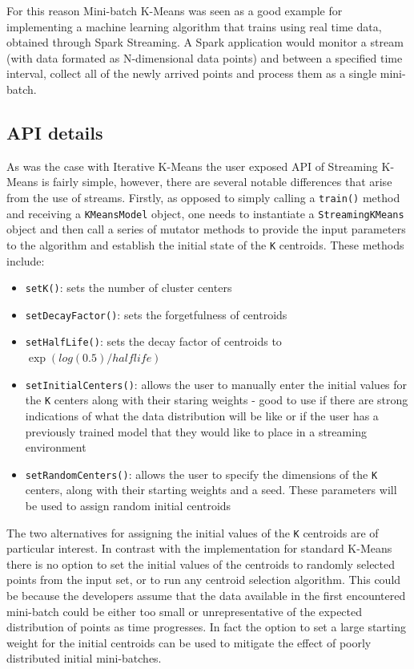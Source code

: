 \documentclass{l4proj}
\begin{document}
For this reason Mini-batch K-Means was seen as a good example for implementing a machine learning algorithm that trains using real time data, obtained through Spark Streaming. A Spark application would monitor a stream (with data formated as N-dimensional data points) and between a specified time interval, collect all of the newly arrived points and process them as a single mini-batch.

\subsection{API details}

As was the case with Iterative K-Means the user exposed API of Streaming K-Means is fairly simple, however, there are several notable differences that arise from the use of streams. Firstly, as opposed to simply calling a \texttt{train()} method and receiving a \texttt{KMeansModel} object, one needs to instantiate a \texttt{StreamingKMeans} object and then call a series of mutator methods to provide the input parameters to the algorithm and establish the initial state of the \texttt{K} centroids. These methods include:

\begin{itemize}
\item \texttt{setK()}: sets the number of cluster centers
\item \texttt{setDecayFactor()}: sets the forgetfulness of centroids
\item \texttt{setHalfLife()}: sets the decay factor of centroids to $\exp(log(0.5) / halflife)$
\item \texttt{setInitialCenters()}: allows the user to manually enter the initial values for the \texttt{K} centers along with their staring weights - good to use if there are strong indications of what the data distribution will be like or if the user has a previously trained model that they would like to place in a streaming environment
\item \texttt{setRandomCenters()}: allows the user to specify the dimensions of the \texttt{K} centers, along with their starting weights and a seed. These parameters will be used to assign random initial centroids
\end{itemize}

The two alternatives for assigning the initial values of the \texttt{K} centroids are of particular interest. In contrast with the implementation for standard K-Means there is no option to set the initial values of the centroids to randomly selected points from the input set, or to run any centroid selection algorithm. This could be because the developers assume that the data available in the first encountered mini-batch could be either too small or unrepresentative of the expected distribution of points as time progresses. In fact the option to set a large starting weight for the initial centroids can be used to mitigate the effect of poorly distributed initial mini-batches.
\end{document}
